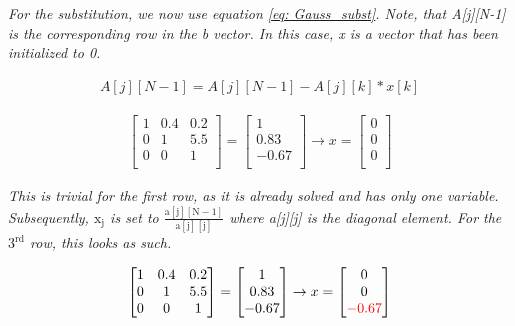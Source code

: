 \textit{For the substitution, we now use equation \ref{eq: Gauss_subst}. Note, that A[j][N-1] is the corresponding row in the b vector. In this case, x is a vector that has been initialized to 0.}

\begin{align}
    \label{eq: Gauss_subst}
    A[j][N-1] = A[j][N-1] - A[j][k] * x[k]
\end{align}

\begin{align*}
    \begin{bmatrix}
        1 & 0.4 & 0.2 \\
        0 & 1 & 5.5 \\
        0 & 0 & 1 \\
    \end{bmatrix}
    =
    \begin{bmatrix}
        1 \\
        0.83 \\
        -0.67 \\
    \end{bmatrix}
    \rightarrow
    x =
    \begin{bmatrix}
        0 \\
        0 \\
        0 \\
    \end{bmatrix}
\end{align*}

\textit{This is trivial for the first row, as it is already solved and has only one variable. Subsequently, $\mathrm{x_j}$ is set to $\mathrm{\frac{a[j][N-1]}{a[j][j]}}$ where a[j][j] is the diagonal element. For the $\mathrm{3^{rd}}$ row, this looks as such.}

\begin{align*}
    \begin{bmatrix}
        1 & 0.4 & 0.2 \\
        0 & 1 & 5.5 \\
        0 & 0 & 1 \\
    \end{bmatrix}
    =
    \begin{bmatrix}
        1 \\
        0.83 \\
        -0.67 \\
    \end{bmatrix}
    \rightarrow
    x =
    \begin{bmatrix}
        0 \\
        0 \\
        \color{red}-0.67 \\
    \end{bmatrix}
\end{align*}

